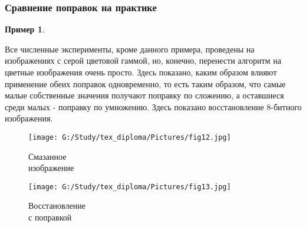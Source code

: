 \documentclass[a4paper]{article}
\theoremstyle{definition}
\newtheorem{example}{Пример}[section]
\begin{document}
\subsubsection{Сравнение поправок на практике}


\begin{example} \label{ex32}

Все численные эксперименты, кроме данного примера, проведены на изображениях с серой цветовой гаммой, но, конечно, перенести алгоритм на цветные изображения очень просто. Здесь показано, каким образом влияют применение обеих поправок одновременно, то есть таким образом, что самые малые собственные значения получают поправку по сложению, а оставшиеся среди малых - поправку по умножению. Здесь показано восстановление 8-битного изображения.

\hspace*{-\parindent}
\begin{minipage}{80mm}
    \begin{figure}[H]
            \texttt{[image: G:/Study/tex\_diploma/Pictures/fig12.jpg]}
            \label{Pic12}
            \caption[Смазанное\\изображение]{Смазанное\\изображение}
        \end{figure}
\end{minipage}
\begin{minipage}{80mm}
    \begin{figure}[H]
            \texttt{[image: G:/Study/tex\_diploma/Pictures/fig13.jpg]}
            \label{Pic13}
            \caption[Восстановление\\с поправкой]{Восстановление\\с поправкой}
        \end{figure}
\end{minipage}

\end{example}
\end{document}
